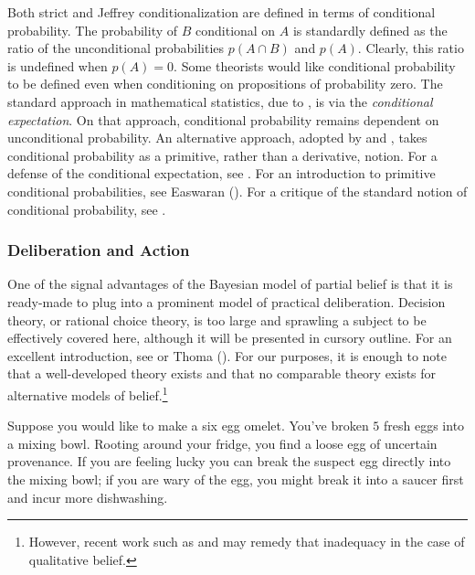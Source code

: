 Both strict and Jeffrey conditionalization are defined in terms of conditional
probability. The probability of $B$ conditional on $A$ is standardly defined as
the ratio of the unconditional probabilities $p(A\cap B)$ and $p(A)$. Clearly,
this ratio is undefined when $p(A)=0$. Some theorists would like conditional
probability to be defined even when conditioning on propositions of probability
zero. The standard approach in mathematical statistics, due to
\citet{kolmogorov1950foundations}, is via the {\em conditional expectation}. On
that approach, conditional probability remains dependent on unconditional
probability. An alternative approach, adopted by \citet{popper1955probability}
and \citet{renyi1955newsystem}, takes conditional probability as a primitive,
rather than a derivative, notion. For a defense of the conditional expectation,
see \citet{gyenis2017conditioning}. For an introduction to primitive conditional
probabilities, see Easwaran (). For a critique of the standard
notion of conditional probability, see \citet{hajek2003what}. 


\subsubsection{Deliberation and Action}

One of the signal advantages of the Bayesian model of partial belief is that it
is ready-made to plug into a prominent model of practical deliberation. Decision
theory, or rational choice theory, is too large and sprawling a subject to be
effectively covered here, although it will be presented in cursory outline. For
an excellent introduction, see \citet{sep-rationality-normative-utility} or Thoma
(). For our purposes, it is enough to note that a
well-developed theory exists and that no comparable theory exists for
alternative models of belief.\footnote{However, recent work such as
\citet{lin2013foundations} and \citet{spohn2017knightian, spohn2019defeasible}
may remedy that inadequacy in the case of qualitative belief.}

Suppose you would like to make a six egg omelet. You've broken $5$ fresh eggs
into a mixing bowl. Rooting around your fridge, you find a loose egg of
uncertain provenance. If you are feeling lucky you can break the suspect egg
directly into the mixing bowl; if you are wary of the egg, you might break it
into a saucer first and incur more dishwashing.

